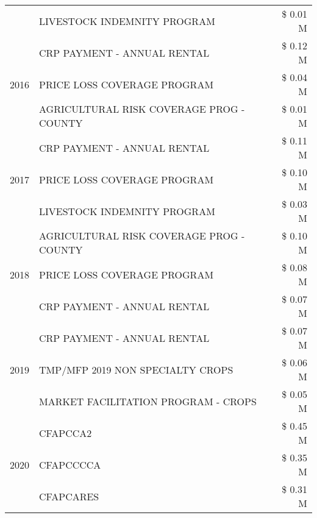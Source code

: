 \begin{tabular}{llr}
 & LIVESTOCK INDEMNITY PROGRAM & \$ 0.01 M \\
\cline{1-3}
\multirow[t]{3}{*}{2016} & CRP PAYMENT - ANNUAL RENTAL & \$ 0.12 M \\
 & PRICE LOSS COVERAGE PROGRAM & \$ 0.04 M \\
 & AGRICULTURAL RISK COVERAGE PROG - COUNTY & \$ 0.01 M \\
\cline{1-3}
\multirow[t]{3}{*}{2017} & CRP PAYMENT - ANNUAL RENTAL & \$ 0.11 M \\
 & PRICE LOSS COVERAGE PROGRAM & \$ 0.10 M \\
 & LIVESTOCK INDEMNITY PROGRAM & \$ 0.03 M \\
\cline{1-3}
\multirow[t]{3}{*}{2018} & AGRICULTURAL RISK COVERAGE PROG - COUNTY & \$ 0.10 M \\
 & PRICE LOSS COVERAGE PROGRAM & \$ 0.08 M \\
 & CRP PAYMENT - ANNUAL RENTAL & \$ 0.07 M \\
\cline{1-3}
\multirow[t]{3}{*}{2019} & CRP PAYMENT - ANNUAL RENTAL & \$ 0.07 M \\
 & TMP/MFP 2019 NON SPECIALTY CROPS & \$ 0.06 M \\
 & MARKET FACILITATION PROGRAM - CROPS & \$ 0.05 M \\
\cline{1-3}
\multirow[t]{3}{*}{2020} & CFAPCCA2 & \$ 0.45 M \\
 & CFAPCCCCA & \$ 0.35 M \\
 & CFAPCARES & \$ 0.31 M \\
\cline{1-3}
\bottomrule
\end{tabular}
